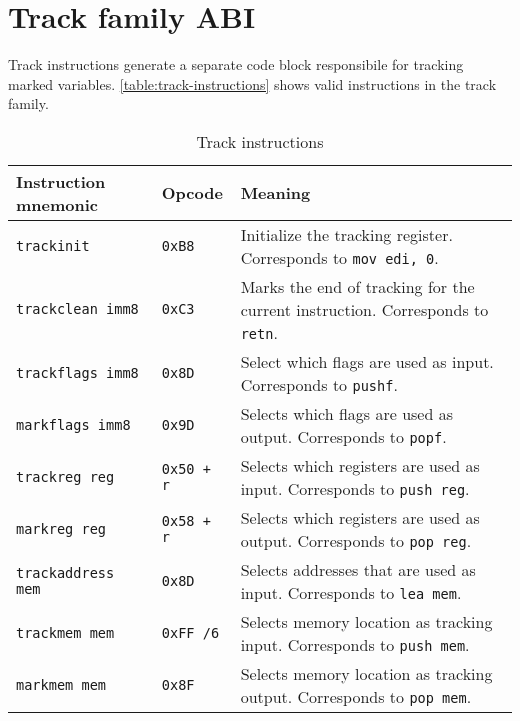 \documentclass[12pt]{report}
\begin{document}
\section{Track family ABI}
\label{sec:track-family-abi}
Track instructions generate a separate code block responsibile for tracking marked variables. \autoref{table:track-instructions} shows valid instructions in the track family.\\
\begin{table}[H]
	\begin{tabular}{| l | l | p{10cm} |}
		\hline
		\textbf{Instruction mnemonic} &	\textbf{Opcode} & \textbf{Meaning}\\ \hline
		\texttt{trackinit}		  & \texttt{0xB8}     & Initialize the tracking register. Corresponds to \texttt{mov edi, 0}.\\ \hline
		\texttt{trackclean imm8}  & \texttt{0xC3}     & Marks the end of tracking for the current instruction. Corresponds to \texttt{retn}.\\ \hline
		\texttt{trackflags imm8}  & \texttt{0x8D}     & Select which flags are used as input. Corresponds to \texttt{pushf}.\\ \hline
		\texttt{markflags imm8}   & \texttt{0x9D}     & Selects which flags are used as output. Corresponds to \texttt{popf}.\\ \hline
		\texttt{trackreg reg}     & \texttt{0x50 + r} & Selects which registers are used as input. Corresponds to \texttt{push reg}.\\ \hline
		\texttt{markreg reg}      & \texttt{0x58 + r} & Selects which registers are used as output. Corresponds to \texttt{pop reg}.\\ \hline
		\texttt{trackaddress mem} & \texttt{0x8D}     & Selects addresses that are used as input. Corresponds to \texttt{lea mem}.\\ \hline
		\texttt{trackmem mem}     & \texttt{0xFF /6}  & Selects memory location as tracking input. Corresponds to \texttt{push mem}.\\ \hline
		\texttt{markmem mem}      & \texttt{0x8F}     & Selects memory location as tracking output. Corresponds to \texttt{pop mem}.\\ \hline
	\end{tabular}
	\caption{Track instructions}
	\label{table:track-instructions}
\end{table}
\end{document}
